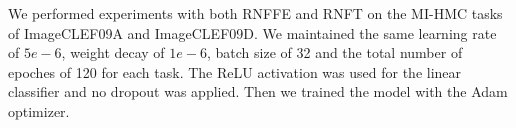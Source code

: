 \documentclass[wcp]{jmlr}
\begin{document}


We performed experiments with both RNFFE and RNFT on the MI-HMC tasks of ImageCLEF09A and ImageCLEF09D. We maintained the same learning rate of $5e-6$, weight decay of $1e-6$, batch size of 32 and the total number of epoches of 120 for each task. The ReLU activation was used for the linear classifier and no dropout was applied.
Then we trained the model with the Adam optimizer. %
\end{document}
